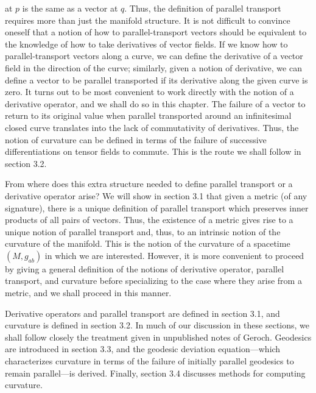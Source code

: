 


at $p$ is the same as a vector at $q$. Thus, the definition of parallel transport requires
more than just the manifold structure. It is not difficult to convince oneself that a
notion of how to parallel-transport vectors should be equivalent to the knowledge of
how to take derivatives of vector fields. If we know how to parallel-transport vectors
along a curve, we can define the derivative of a vector field in the direction of the
curve; similarly, given a notion of derivative, we can define a vector to be parallel
transported if its derivative along the given curve is zero. It turns out to be most
convenient to work directly with the notion of a derivative operator, and we shall do
so in this chapter. The failure of a vector to return to its original value when parallel
transported around an infinitesimal closed curve translates into the lack of commutativity of derivatives. Thus, the notion of curvature can be defined in terms of the
failure of successive differentiations on tensor fields to commute. This is the route
we shall follow in section 3.2.

From where does this extra structure needed to define parallel transport or a
derivative operator arise? We will show in section 3.1 that given a metric (of any
signature), there is a unique definition of parallel transport which preserves inner
products of all pairs of vectors. Thus, the existence of a metric gives rise to a unique
notion of parallel transport and, thus, to an intrinsic notion of the curvature of the
manifold. This is the notion of the curvature of a spacetime $(M,g_{ab})$ in which we are
interested. However, it is more convenient to proceed by giving a general definition
of the notions of derivative operator, parallel transport, and curvature before specializing to the case where they arise from a metric, and we shall proceed in this manner.

Derivative operators and parallel transport are defined in section 3.1, and curvature is defined in section 3.2. In much of our discussion in these sections, we shall
follow closely the treatment given in unpublished notes of Geroch. Geodesics are
introduced in section 3.3, and the geodesic deviation equation---which characterizes
curvature in terms of the failure of initially parallel geodesics to remain parallel---is
derived. Finally, section 3.4 discusses methods for computing curvature.

